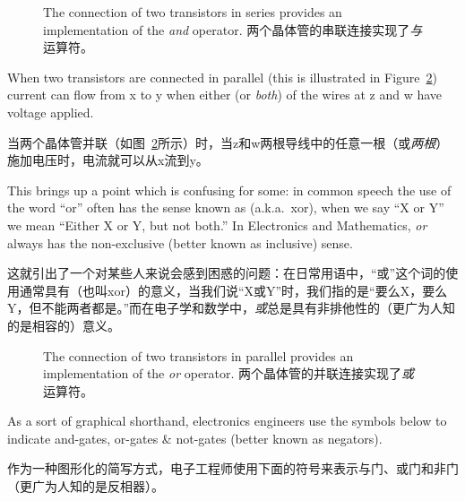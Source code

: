 \begin{figure}[!hbtp] 
\begin{center}

\end{center}
\caption[Series connections implement \emph{and}.串联连接实现了{\em 与}。]{%
The connection of two transistors in series provides %
an implementation of the {\em and} operator. 两个晶体管的串联连接实现了{\em 与}运算符。}
\label{fig:series}
\end{figure}

When two transistors are connected in parallel (this is illustrated in
Figure~\ref{fig:par}) current can flow from x to y when either (or {\em both})
of the wires at z and w have voltage applied.

当两个晶体管并联（如图~\ref{fig:par}所示）时，当z和w两根导线中的任意一根（或{\em 两根}）施加电压时，电流就可以从x流到y。

This brings up a point
which is confusing for some: in common speech the use of the word ``or'' often
has the sense known as  (a.k.a.\ xor), when we say ``X or Y''
we mean ``Either X or Y, but not both.''  In Electronics and Mathematics,
{\em or} always has the non-exclusive (better known as 
inclusive) sense.

这就引出了一个对某些人来说会感到困惑的问题：在日常用语中，“或”这个词的使用通常具有（也叫xor）的意义，当我们说“X或Y”时，我们指的是“要么X，要么Y，但不能两者都是。”而在电子学和数学中，{\em 或}总是具有非排他性的（更广为人知的是相容的）意义。

\begin{figure}[!hbtp] 
\begin{center}

\end{center}
\caption[Parallel connections implement \emph{or}.并联连接实现了{\em 或}]{%
The connection of two transistors in parallel provides %
an implementation of the {\em or} operator. 两个晶体管的并联连接实现了{\em 或}运算符。}
\label{fig:par}
\end{figure}

\newpage

As a sort of graphical shorthand, electronics engineers use the symbols
below to indicate and-gates, or-gates \& not-gates (better known as negators).

作为一种图形化的简写方式，电子工程师使用下面的符号来表示与门、或门和非门（更广为人知的是反相器）。

